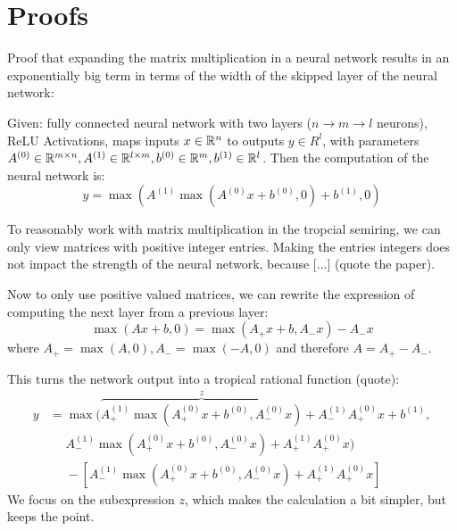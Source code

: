 \chapter{Proofs}
Proof that expanding the matrix multiplication in a neural network results in an exponentially big term in terms of the width of the skipped layer of the neural network:

Given: fully connected neural network with two layers ($n \rightarrow m \rightarrow l$ neurons), ReLU Activations, maps inputs $x \in \mathbb{R}^n$ to outputs $y \in R^l$, with parameters $A^{(0)} \in \mathbb{R}^{m \times n}, A^{(1)} \in \mathbb{R}^{l \times m}, b^{(0)} \in \mathbb{R}^m, b^{(1)} \in \mathbb{R}^l$.
Then the computation of the neural network is:
$$y = \max(A^{(1)}\max(A^{(0)}x + b^{(0)}, 0) + b^{(1)}, 0)$$

To reasonably work with matrix multiplication in the tropcial semiring, we can only view matrices with positive integer entries.
Making the entries integers does not impact the strength of the neural network, because [...] (quote the paper).

Now to only use positive valued matrices, we can rewrite the expression of computing the next layer from a previous layer:
$$\max(Ax + b, 0) = \max(A_+ x + b, A_- x) - A_- x$$
where $A_+ = \max(A, 0), A_- = \max(-A, 0)$ and therefore $A = A_+ - A_-$.

This turns the network output into a tropical rational function (quote):
\begin{align*}
    y & = \max(\overbrace{A^{(1)}_+ \max(A^{(0)}_+ x + b^{(0)}, A^{(0)}_- x)}^z + A^{(1)}_- A^{(0)}_+ x + b^{(1)}, \\
      & \phantom{{} =} A^{(1)}_- \max(A^{(0)}_+ x + b^{(0)}, A^{(0)}_- x) + A^{(1)}_+ A^{(0)}_+ x)                 \\
      & \phantom{{} =} -\left[A^{(1)}_- \max(A^{(0)}_+ x + b^{(0)}, A^{(0)}_- x) + A^{(1)}_+ A^{(0)}_+ x\right]
\end{align*}
We focus on the subexpression $z$, which makes the calculation a bit simpler, but keeps the point.

